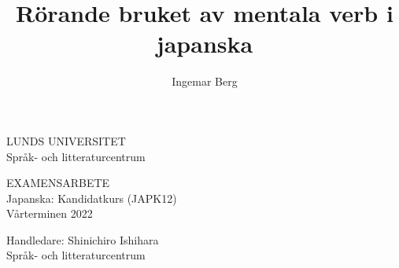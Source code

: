 \documentclass[12pt,a4paper]{article}
\begin{document}
\clearpage
{}

\title{Rörande bruket av mentala verb i japanska}
\author{Ingemar Berg}
\date{}





\hypersetup{pageanchor=false}

\begin{titlepage}
\noindent
\begin{minipage}[t]{6cm}
LUNDS UNIVERSITET \\
Språk- och litteraturcentrum
\end{minipage}
\hfill
\begin{minipage}[t]{6cm}
EXAMENSARBETE \\
Japanska: Kandidatkurs (JAPK12) \\
Vårterminen 2022
\end{minipage}

\begin{center}
\end{center}

\vfill
\hfill
\noindent
\begin{minipage}[t]{6cm}
Handledare: Shinichiro Ishihara \\
Språk- och litteraturcentrum
\end{minipage}
\end{titlepage}




\hypersetup{pageanchor=true}


\newpage
\end{document}
